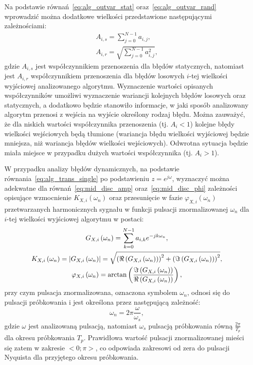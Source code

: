 Na podstawie równań~\eqref{eq:alg_outvar_stat} oraz~\eqref{eq:alg_outvar_rand} wprowadzić można dodatkowe wielkości przedstawione następującymi zależnościami:
\begin{gather}
A_{i,s} = \sum _{j = 0} ^{N-1} a_{i, j} \label{eq:alg_trans_stat}, \\
A_{i,r} = \sqrt{\sum _{j = 0} ^{N-1} a_{i, j}^{2}} \label{eq:alg_trans_rand},
\end{gather}
gdzie $A_{i,s}$ jest współczynnikiem przenoszenia dla błędów statycznych, natomiast jest $A_{i,r}$ współczynnikiem przenoszenia dla błędów losowych $i$-tej wielkości wyjściowej analizowanego algorytmu. Wyznaczenie wartości opisanych współczynników umożliwi wyznaczenie wariancji kolejnych błędów losowych oraz statycznych, a dodatkowo będzie stanowiło informacje, w jaki sposób analizowany algorytm przenosi z wejścia na wyjście określony rodzaj błędu. Można zauważyć, że dla niskich wartości współczynnika przenoszenia (tj. $A_{i} < 1$) kolejne błędy wielkości wejściowych będą tłumione (wariancja błędu wielkości wyjściowej będzie mniejsza, niż wariancja błędów wielkości wejściowych). Odwrotna sytuacja będzie miała miejsce w przypadku dużych wartości współczynnika (tj. $A_{i} > 1$).

W przypadku analizy błędów dynamicznych, na podstawie równania~\eqref{eq:alg_trans_single} po podstawieniu $z = e^{j\omega}$, wyznaczyć można adekwatne dla równań~\eqref{eq:mid_disc_amp} oraz~\eqref{eq:mid_disc_phi} zależności opisujące wzmocnienie $K_{X,i}(\omega_{n})$ oraz przesunięcie w fazie $\varphi_{X,i}(\omega_{n})$ przetwarzanych harmonicznych sygnału w funkcji pulsacji znormalizowanej $\omega_{n}$ dla $i$-tej wielkości wyjściowej algorytmu w postaci:
\begin{gather}
G_{X,i} \left(\omega_{n}\right) = \sum _{k = 0} ^{N-1} a_{i,k} e^{-j k \omega_{n}} \label{eq:alg_trans_norm}, \\
K_{X,i} \left(\omega_{n}\right) = \left| G_{X,i} \left(\omega_{n}\right) \right| = \sqrt{\left( \Re \left( G_{X,i} \left(\omega_{n}\right) \right) \right)^{2} + \left( \Im \left( G_{X,i} \left(\omega_{n}\right) \right) \right)^{2}} \label{eq:alg_trans_amp}, \\
\varphi_{X,i} \left(\omega_{n}\right) = \arctan \left( \frac{\Im \left( G_{X,i} \left(\omega_{n}\right) \right)}{\Re \left( G_{X,i} \left(\omega_{n}\right) \right)} \right) \label{eq:alg_trans_phi},
\end{gather}
przy czym pulsacja znormalizowana, oznaczona symbolem $\omega_{n}$, odnosi się do pulsacji próbkowania i jest określona przez następującą zależność:
\begin{equation}
\omega_{n} = 2\pi \frac{\omega}{\omega_{s}} \label{eq:puls_norm},
\end{equation}
gdzie $\omega$ jest analizowaną pulsacją, natomiast $\omega_{s}$ pulsacją próbkowania równą $\frac{2 \pi}{T_{p}}$ dla okresu próbkowania $T_{p}$. Prawidłowa wartość pulsacji znormalizowanej mieści się zatem w zakresie $<0;\pi>$, co odpowiada zakresowi od zera do pulsacji Nyquista dla przyjętego okresu próbkowania.

